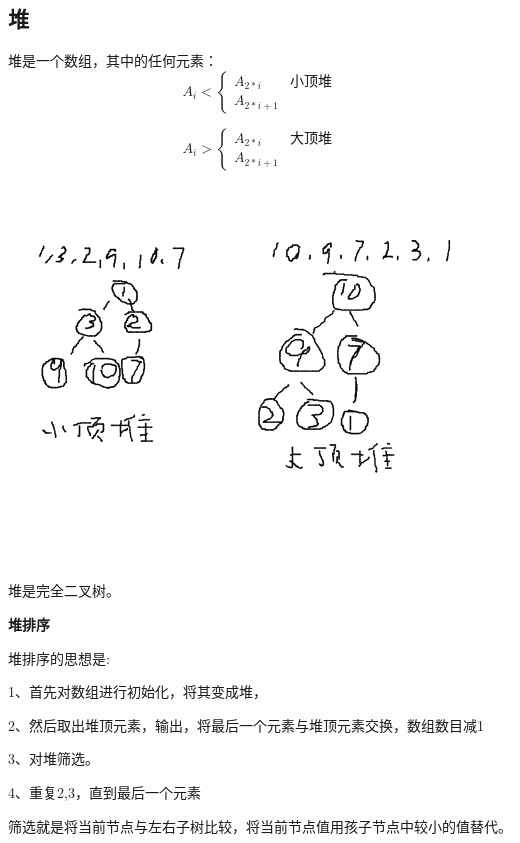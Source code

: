 \documentclass{article}
\begin{document}
	\subsection{堆}
		
		堆是一个数组，其中的任何元素：
		\[
			A_{i}<
				\left\{
					\begin{array}{ll}
						A_{2*i} & \textbf{小顶堆}\\
						A_{2*i+1}
					\end{array}
				\right .	
		\]

		\[
			A_{i}>
				\left\{
					\begin{array}{ll}
						A_{2*i} & \textbf{大顶堆}\\
						A_{2*i+1}
					\end{array}
				\right .	
		\]

		\includegraphics[scale=0.4]{./pic/tree-06.png}

		堆是完全二叉树。

		\textbf{堆排序}
		
		堆排序的思想是:

		1、首先对数组进行初始化，将其变成堆，
		
		2、然后取出堆顶元素，输出，将最后一个元素与堆顶元素交换，数组数目减1
		
		3、对堆筛选。

		4、重复2,3，直到最后一个元素

		筛选就是将当前节点与左右子树比较，将当前节点值用孩子节点中较小的值替代。
\end{document}
